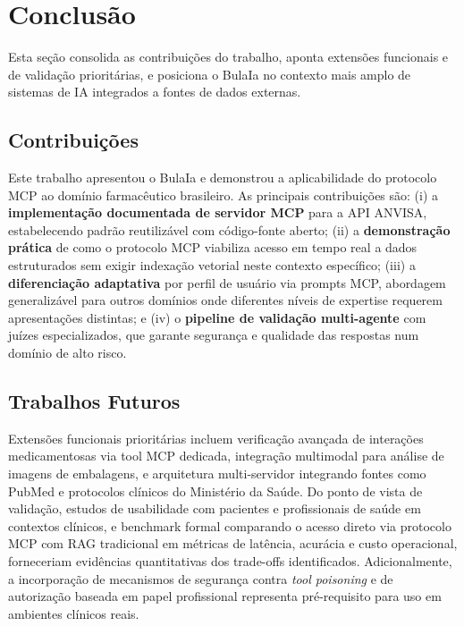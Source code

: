 \documentclass[12pt]{article}
\begin{document}

\section{Conclusão}
\label{sec:conclusao}

Esta seção consolida as contribuições do trabalho, aponta extensões funcionais e de validação prioritárias, e posiciona o BulaIa no contexto mais amplo de sistemas de IA integrados a fontes de dados externas.

\subsection{Contribuições}

Este trabalho apresentou o BulaIa e demonstrou a aplicabilidade do protocolo MCP ao domínio farmacêutico brasileiro. As principais contribuições são: (i) a \textbf{implementação documentada de servidor MCP} para a API ANVISA, estabelecendo padrão reutilizável com código-fonte aberto; (ii) a \textbf{demonstração prática} de como o protocolo MCP viabiliza acesso em tempo real a dados estruturados sem exigir indexação vetorial neste contexto específico; (iii) a \textbf{diferenciação adaptativa} por perfil de usuário via prompts MCP, abordagem generalizável para outros domínios onde diferentes níveis de expertise requerem apresentações distintas; e (iv) o \textbf{pipeline de validação multi-agente} com juízes especializados, que garante segurança e qualidade das respostas num domínio de alto risco.

\subsection{Trabalhos Futuros}

Extensões funcionais prioritárias incluem verificação avançada de interações medicamentosas via tool MCP dedicada, integração multimodal para análise de imagens de embalagens, e arquitetura multi-servidor integrando fontes como PubMed e protocolos clínicos do Ministério da Saúde. Do ponto de vista de validação, estudos de usabilidade com pacientes e profissionais de saúde em contextos clínicos, e benchmark formal comparando o acesso direto via protocolo MCP com RAG tradicional em métricas de latência, acurácia e custo operacional, forneceriam evidências quantitativas dos trade-offs identificados. Adicionalmente, a incorporação de mecanismos de segurança contra \emph{tool poisoning} e de autorização baseada em papel profissional representa pré-requisito para uso em ambientes clínicos reais.
\end{document}
